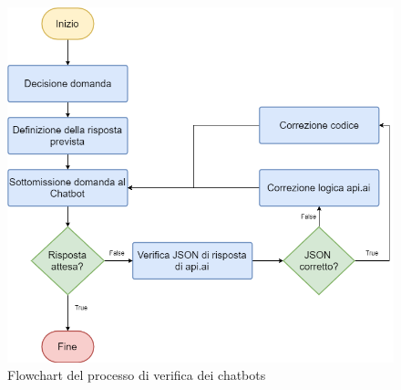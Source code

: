 \begin{figure}[t]
	\centering
	\includegraphics[scale=0.5]{../Immagini/verifica.png}
	\caption{Flowchart del processo di verifica dei chatbots}
\end{figure}

